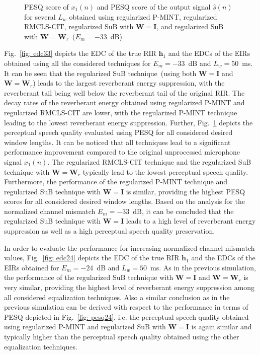 \documentclass{article}
\begin{document}


\begin{figure}[b!]
  
\caption{PESQ score of $x_1(n)$ and PESQ score of the output signal $\hat{s}(n)$ for several $L_w$ obtained using regularized P-MINT, regularized RMCLS-CIT, regularized SuB with $\mathbf{W} = \mathbf{I}$, and regularized SuB with $\mathbf{W} = \mathbf{W}_{r}$~($E_m = -33$~dB)}
\label{fig: pesq33}
\end{figure}

Fig.~\ref{fig: edc33} depicts the EDC of the true RIR $\mathbf{h}_1$ and the EDCs of the EIRs obtained using all the considered techniques for $E_m = -33$~dB and $L_w = 50$~ms.
It can be seen that the regularized SuB technique~(using both $\mathbf{W} = \mathbf{I}$ and $\mathbf{W} = \mathbf{W}_{r}$) leads to the largest reverberant energy suppression, with the reverberant tail being well below the reverberant tail of the original RIR.
The decay rates of the reverberant energy obtained using regularized P-MINT and regularized RMCLS-CIT are lower, with the regularized P-MINT technique leading to the lowest reverberant energy suppression.
Further, Fig.~\ref{fig: pesq33} depicts the perceptual speech quality evaluated using PESQ for all considered desired window lengths.
It can be noticed that all techniques lead to a significant performance improvement compared to the original unprocessed microphone signal $x_1(n)$.
The regularized RMCLS-CIT technique and the regularized SuB technique with $\mathbf{W} = \mathbf{W}_{r}$ typically lead to the lowest perceptual speech quality.
Furthermore, the performance of the regularized P-MINT technique and regularized SuB technique with $\mathbf{W} = \mathbf{I}$ is similar, providing the highest PESQ scores for all considered desired window lengths.
Based on the analysis for the normalized channel mismatch $E_m = -33$~dB, it can be concluded that the regularized SuB technique with $\mathbf{W} = \mathbf{I}$ leads to a high level of reverberant energy suppression as well as a high perceptual speech quality preservation.

In order to evaluate the performance for increasing normalized channel mismatch values, Fig.~\ref{fig: edc24} depicts the EDC of the true RIR $\mathbf{h}_1$ and the EDCs of the EIRs obtained for $E_m = -24$~dB and $L_w = 50$~ms.
As in the previous simulation, the performance of the regularized SuB technique with $\mathbf{W} = \mathbf{I}$ and $\mathbf{W} = \mathbf{W}_{r}$ is very similar, providing the highest level of reverberant energy suppression among all considered equalization techniques.
Also a similar conclusion as in the previous simulation can be derived with respect to the performance in terms of PESQ depicted in Fig.~\ref{fig: pesq24}, i.e. the perceptual speech quality obtained using regularized P-MINT and regularized SuB with $\mathbf{W} = \mathbf{I}$ is again similar and typically higher than the perceptual speech quality obtained using the other equalization techniques.
\end{document}
